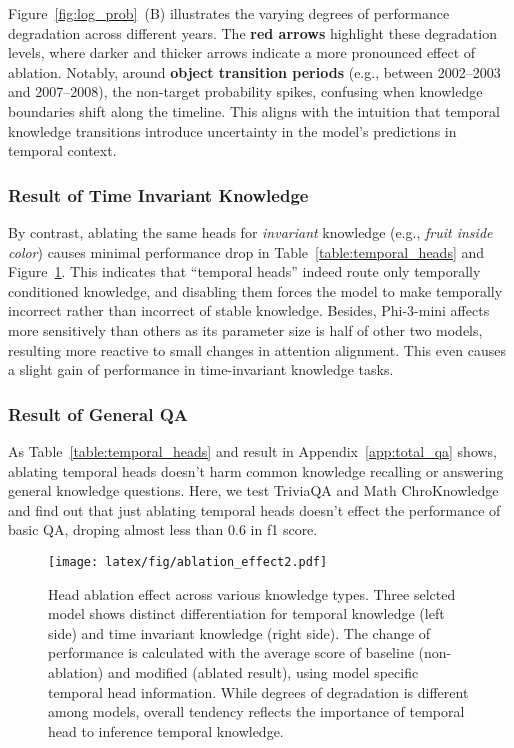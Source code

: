Figure~\ref{fig:log_prob}~(B) illustrates the varying degrees of performance degradation across different years. 
The \textbf{red arrows} highlight these degradation levels, where darker and thicker arrows indicate a more pronounced effect of ablation. 
Notably, around \textbf{object transition periods} (e.g., between 2002--2003 and 2007--2008), the non-target probability spikes, confusing when knowledge boundaries shift along the timeline. 
This aligns with the intuition that temporal knowledge transitions introduce uncertainty in the model’s predictions in temporal context.

\subsubsection{Result of Time Invariant Knowledge}
By contrast, ablating the same heads for \emph{invariant} knowledge (e.g., \emph{fruit inside color}) causes minimal performance drop in Table~\ref{table:temporal_heads} and Figure~\ref{fig:ablation}.
This indicates that “temporal heads” indeed route only temporally conditioned knowledge, and disabling them forces the model to make temporally incorrect rather than incorrect of stable knowledge.
Besides, Phi-3-mini affects more sensitively than others as its parameter size is half of other two models, resulting more reactive to small changes in attention alignment.
This even causes a slight gain of performance in time-invariant knowledge tasks.

\subsubsection{Result of General QA}
As Table~\ref{table:temporal_heads} and result in Appendix~\ref{app:total_qa} shows, ablating temporal heads doesn't harm common knowledge recalling or answering general knowledge questions.
Here, we test TriviaQA and Math ChroKnowledge and find out that just ablating temporal heads doesn't effect the performance of basic QA, droping almost less than 0.6 in f1 score.

\begin{figure}[t]
\vspace{-10pt}
\begin{center}
    \texttt{[image: latex/fig/ablation\_effect2.pdf]}
\end{center}%
\vspace{-10pt}%
\caption{
Head ablation effect across various knowledge types.
Three selcted model shows distinct differentiation for temporal knowledge (\textcolor{cyan!70!gray}{left side}) and time invariant knowledge (\textcolor{pink!80!gray}{right side}).
The change of performance is calculated with the average score of baseline (non-ablation) and modified (ablated result), using model specific temporal head information.
While degrees of degradation is different among models, overall tendency reflects the importance of temporal head to inference temporal knowledge.
}
\label{fig:ablation}
\vspace{-10pt}
\end{figure}


